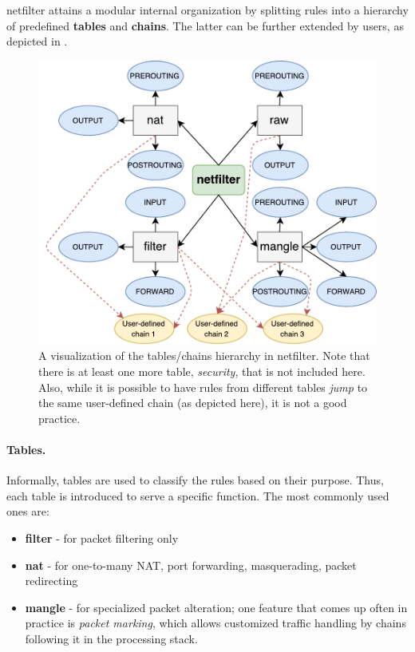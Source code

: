 netfilter attains a modular internal organization by splitting rules into a
hierarchy of predefined \textbf{tables} and \textbf{chains}.  The latter can be
further extended by users, as depicted in
.

\begin{figure}[h]
  \centering
  \captionsetup{justification=centering}
  \includegraphics[scale=0.6]{assets/img/iptables-hierarchy}
  \caption[A visualization of the tables/chains hierarchy in netfilter.]{A
  visualization of the tables/chains hierarchy in netfilter. Note that there is
  at least one more table, \emph{security}, that is not included here. Also,
  while it is possible to have rules from different tables \emph{jump} to the
  same user-defined chain (as depicted here), it is not a good practice.}
  \label{fig:iptables-hierarchy}
\end{figure}

\paragraph{Tables.}
Informally, tables are used to classify the rules based on their purpose.
Thus, each table is introduced to serve a specific function.  The most commonly
used ones are:
\begin{itemize}
  \item \textbf{filter} - for packet filtering only
  \item \textbf{nat} - for one-to-many NAT, port forwarding, masquerading,
    packet redirecting
  \item \textbf{mangle} - for specialized packet alteration; one feature that
    comes up often in practice is \emph{packet marking}, which allows
    customized traffic handling by chains following it in the processing stack.
\end{itemize}

